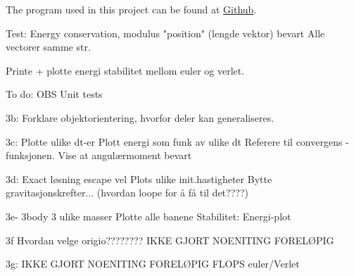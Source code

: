 


The program used in this project can be found at \href{https://github.com/kjetka/Project3}{Github}. 




Test: 		Energy conservation, modulus "position" (lengde vektor) bevart
				Alle vectorer samme str.



	Printe + plotte energi stabilitet mellom euler og verlet.


To do:
	OBS Unit tests
	
	3b:
								Forklare objektorientering, hvorfor deler kan generaliseres. 
	
	3c: 					  Plotte ulike dt-er
								Plott energi som funk av ulike dt
								Referere til convergens - funksjonen.
								Vise at angulærmoment bevart

	3d: 					  Exact løsning escape vel
								Plots ulike init.hastigheter
								Bytte gravitasjonskrefter... (hvordan loope for å få til det????)
								
	3e- 3body			3 ulike masser
								Plotte alle banene
								Stabilitet: Energi-plot
	
	3f							Hvordan velge origio????????
								IKKE GJORT NOENITING FORELØPIG
	
	3g:							IKKE GJORT NOENITING FORELØPIG					
	FLOPS euler/Verlet
		

